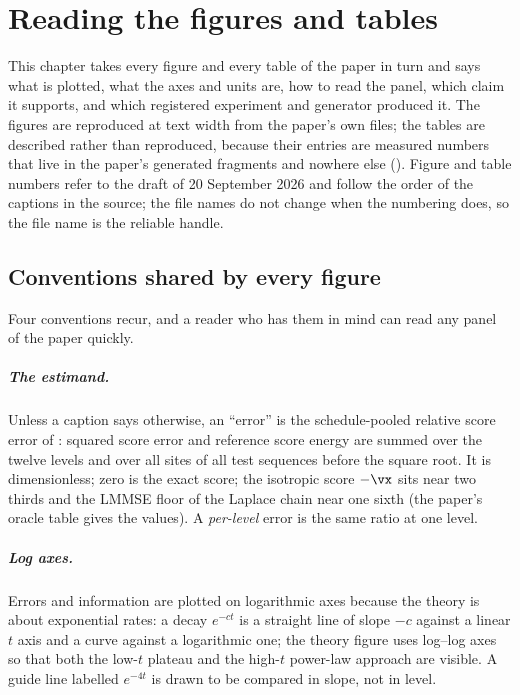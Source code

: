 \chapter{Reading the figures and tables}
\label{ch:reading-the-figures}
\begingroup\sloppy

This chapter takes every figure and every table of the paper in turn and says what is
plotted, what the axes and units are, how to read the panel, which claim it supports,
and which registered experiment and generator produced it. The figures are reproduced
at text width from the paper's own files; the tables are described rather than
reproduced, because their entries are measured numbers that live in the paper's
generated fragments and nowhere else (). Figure and table numbers
refer to the draft of 20 September 2026 and follow the order of the captions in the
source; the file names do not change when the numbering does, so the file name is the
reliable handle.

\section{Conventions shared by every figure}
\label{sec:fig-conventions}

Four conventions recur, and a reader who has them in mind can read any panel of the
paper quickly.

\paragraph{The estimand.} Unless a caption says otherwise, an ``error'' is the
schedule-pooled relative score error of : squared score
error and reference score energy are summed over the twelve levels and over all sites of
all test sequences before the square root. It is dimensionless; zero is the exact
score; the isotropic score $-\vx$ sits near two thirds and the LMMSE floor of the
Laplace chain near one sixth (the paper's oracle table gives the values). A
\emph{per-level} error is the same ratio at one level.

\paragraph{Log axes.} Errors and information are plotted on logarithmic axes because
the theory is about exponential rates: a decay $e^{-ct}$ is a straight line of slope
$-c$ against a linear $t$ axis and a curve against a logarithmic one; the theory figure
uses log--log axes so that both the low-$t$ plateau and the high-$t$ power-law approach
are visible. A guide line labelled $e^{-4t}$ is drawn to be compared in slope, not in
level.

